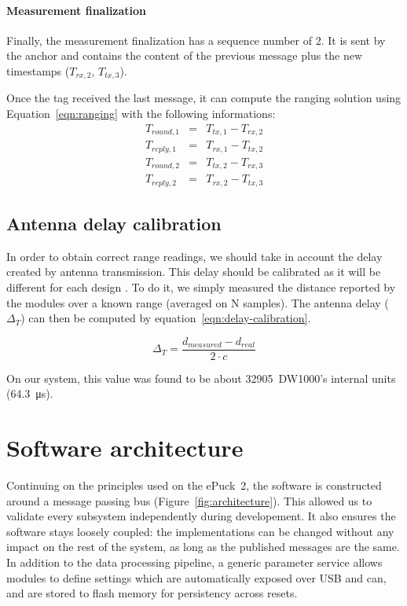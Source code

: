 \documentclass[a4paper, 12pt]{scrreprt}
\begin{document}
\paragraph{Measurement finalization}
Finally, the measurement finalization has a sequence number of 2.
It is sent by the anchor and contains the content of the previous message plus the new timestamps ($T_{rx,2}$, $T_{tx,3}$).

Once the tag received the last message, it can compute the ranging solution using Equation~\ref{eqn:ranging} with the following informations:
\begin{eqnarray*}
    T_{round,1} &=& T_{tx,1} - T_{rx,2} \\
    T_{reply,1} &=& T_{rx,1} - T_{tx,2} \\
    T_{round,2} &=& T_{tx,2} - T_{rx,3} \\
    T_{reply,2} &=& T_{rx,2} - T_{tx,3}
\end{eqnarray*}



\subsection{Antenna delay calibration}
In order to obtain correct range readings, we should take in account the delay created by antenna transmission.
This delay should be calibrated as it will be different for each design \cite{dw1000manual}.
To do it, we simply measured the distance reported by the modules over a known range (averaged on N samples).
The antenna delay ($\Delta_T$) can then be computed by equation~\ref{eqn:delay-calibration}.

\begin{equation}
    \Delta_T = \frac{d_{measured} - d_{real}}{2\cdot c}
    \label{eqn:delay-calibration}
\end{equation}

On our system, this value was found to be about 32905~DW1000's internal units (\SI{64.3}{\micro\second}).



\section{Software architecture}

Continuing on the principles used on the ePuck~2, the software is constructed around a message passing bus (Figure~\ref{fig:architecture}).
This allowed us to validate every subsystem independently during developement.
It also ensures the software stays loosely coupled: the implementations can be changed without any impact on the rest of the system, as long as the published messages are the same.
In addition to the data processing pipeline, a generic parameter service allows modules to define settings which are automatically exposed over USB and \gls{can}, and are stored to flash memory for persistency across resets.
\end{document}

